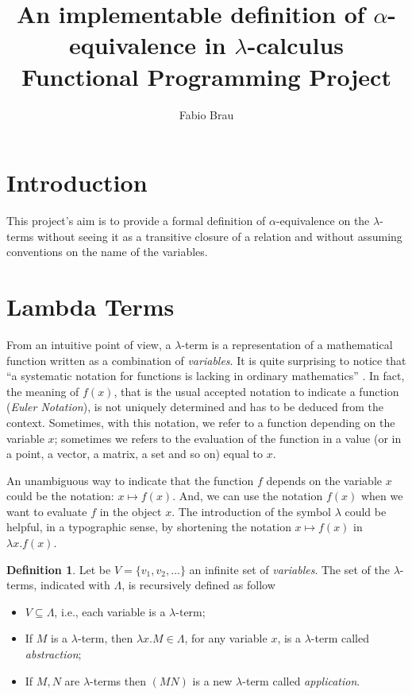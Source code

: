 \documentclass[a4paper,11pt]{article}
\title{An implementable definition of $\alpha$-equivalence in
$\lambda$-calculus\\
{\large Functional Programming Project}}
\author{Fabio Brau}
\theoremstyle{definition}
\newtheorem{defn}{Definition}
\begin{document}
\maketitle
\tableofcontents
\section{Introduction}


This project's aim is to provide a formal definition of $\alpha$-equivalence
on the $\lambda$-terms without seeing it as a transitive closure of a
relation and without assuming conventions on the name of the variables.


\section{Lambda Terms}
From an intuitive point of view, a $\lambda$-term is a representation of
a mathematical function written as a combination of \textit{variables}. It
is quite surprising to notice that ``a systematic notation for functions is lacking
in ordinary mathematics'' \cite{Curry}. In fact, the meaning of $f(x)$, that is the usual
accepted notation to indicate a function (\textit{Euler Notation}), is not uniquely
determined and has to be deduced from the context. Sometimes, with this
notation, we refer to a function depending on the variable $x$; sometimes we refers to the
evaluation of the function in a value (or in a point, a vector, a matrix, a
set and so on) equal to $x$.

An unambiguous way to indicate that the function $f$ depends on the variable $x$ 
could be the notation: $x\mapsto f(x)$. And, we can use the notation $f(x)$
when we want to evaluate $f$ in the object $x$. The introduction of the
symbol $\lambda$ could be helpful, in a typographic sense, by shortening the
notation $x\mapsto f(x)$ in $\lambda x.f(x)$.

\begin{defn}
  Let be $V=\{v_1,v_2,\dots\}$ an infinite set of \textit{variables}. The
  set of the $\lambda$-terms, indicated with $\Lambda$, is recursively
  defined as follow
  \begin{itemize}
    \item $V\subseteq\Lambda$, i.e., each variable is a $\lambda$-term;
    \item If $M$ is a $\lambda$-term, then $\lambda x.M\in\Lambda$, for any variable
      $x$, is a $\lambda$-term called \textit{abstraction};
    \item If $M,N$ are $\lambda$-terms then $(MN)$ is a new $\lambda$-term
      called \textit{application}.
  \end{itemize}
\end{defn}
\end{document}
